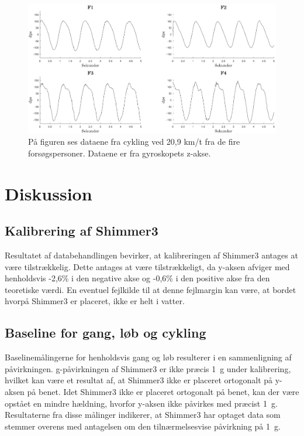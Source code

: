 \begin{figure}[H]
	\centering
	\includegraphics[scale=0.5]{figures/qBilag/cykling_gyro}
	\caption{På figuren ses dataene fra cykling ved 20,9 km/t fra de fire forsøgspersoner. Dataene er fra gyroskopets z-akse.}
	\label{fig:Ap_cykling3}
\end{figure}\vspace{-.25cm}

\section{Diskussion}
\subsection{Kalibrering af Shimmer3}
Resultatet af databehandlingen bevirker, at kalibreringen af Shimmer3 antages at være tilstrækkelig. Dette antages at være tilstrækkeligt, da y-aksen afviger med henholdsvis -2,6\% i den negative akse og -0,6\% i den positive akse fra den teoretiske værdi. En eventuel fejlkilde til at denne fejlmargin kan være, at bordet hvorpå Shimmer3 er placeret, ikke er helt i vatter.

\subsection{Baseline for gang, løb og cykling}
Baselinemålingerne for henholdsvis gang og løb resulterer i en sammenligning af påvirkningen. g-påvirkningen af Shimmer3 er ikke præcis 1~g under kalibrering, hvilket kan være et resultat af, at Shimmer3 ikke er placeret ortogonalt på y-aksen på benet. Idet Shimmer3 ikke er placeret ortogonalt på benet, kan der være opstået en mindre hældning, hvorfor y-aksen ikke påvirkes med præcist 1~g. Resultaterne fra disse målinger indikerer, at Shimmer3 har optaget data som stemmer overens med antagelsen om den tilnærmelsesvise påvirkning på 1~g. 

